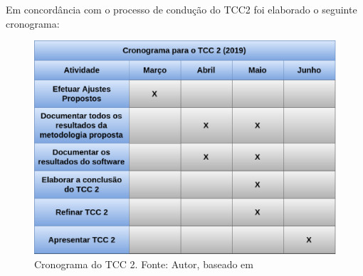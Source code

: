 Em concordância com o processo de condução do TCC2 foi elaborado o seguinte cronograma:

\begin{figure}[h!]
	\centering
  \includegraphics[keepaspectratio=true,scale=0.4]{figuras/cronograma_tcc2.eps}
  \caption[Cronograma do TCC 2.]{Cronograma do TCC 2. Fonte: Autor, baseado em \cite{leonardo}}
	\label{fig:cronograma_tcc2}
\end{figure}
